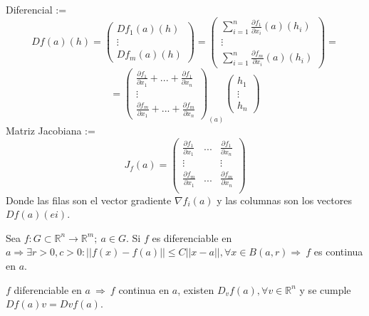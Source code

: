 \begin{nota}
Diferencial :=
\[Df(a)(h)=
\begin{pmatrix}
    Df_1(a)(h)\\
    \vdots\\
    Df_m(a)(h)
\end{pmatrix}=
\begin{pmatrix}
    \sum_{i=1}^n\frac{\partial f_1}{\partial x_i}(a)(h_i)\\
    \vdots\\
    \sum_{i=1}^n\frac{\partial f_m}{\partial x_i}(a)(h_i)
\end{pmatrix}=
\]
\[ =
\begin{pmatrix}
    \frac{\partial f_1}{\partial x_1} + ... + \frac{\partial f_1}{\partial x_n} \\
    \vdots\\
    \frac{\partial f_m}{\partial x_1} + ... + \frac{\partial f_m}{\partial x_n}
\end{pmatrix}_{(a)}
\begin{pmatrix}
    h_1 \\
    \vdots\\
    h_n
\end{pmatrix}
\]
Matriz Jacobiana :=\[
J_f(a)=
\begin{pmatrix}
    \frac{\partial f_1}{\partial x_1}&...&\frac{\partial f_1}{\partial x_n}\\
    \vdots&&\vdots\\
    \frac{\partial f_m}{\partial x_1}&...&\frac{\partial f_m}{\partial x_n}\\
\end{pmatrix}
\]
Donde las filas son el vector gradiente $\nabla f_i(a)$ y las columnas son los vectores $Df(a)(ei)$.
\end{nota}

\begin{theo}
Sea $f:G\subset \mathbb{R}^n \rightarrow \mathbb{R}^m; \ a\in G$. Si $f$ es diferenciable en $a \Rightarrow \exists r>0,c>0: ||f(x)-f(a)|| \leq C||x-a||, \forall x\in B(a,r) \Rightarrow \ f$ es continua en $a$.
\end{theo}

\begin{cor}
$f$ diferenciable en $a \ \Rightarrow \ f$ continua en $a$, existen $D_vf(a), \forall v\in\mathbb{R}^n$ y se cumple $Df(a)v=Dvf(a)$.
\end{cor}

